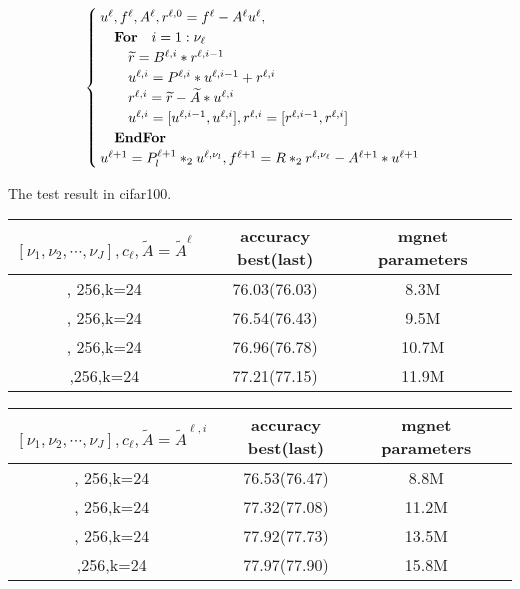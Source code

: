 \begin{equation}\label{eq:densenet}
\begin{cases}
u^{\ell},f^{\ell},A^{\ell},r^{\ell,0}=f^{\ell}-A^{\ell}u^{\ell}, \\

\quad\text{\bf For}\quad i = 1:\nu_{\ell} \\
\quad\quad \widetilde{r}=B^{\ell,i}\ast r^{\ell,i-1} \\
\quad\quad u^{\ell,i}=P^{\ell,i}\ast u^{\ell,i-1}+r^{\ell,i}\\
\quad\quad r^{\ell,i}=\widetilde{r}-\widetilde{A}\ast u^{\ell,i}\\
\quad\quad u^{\ell,i}=[u^{\ell,i-1},u^{\ell,i}],r^{\ell,i}=[r^{\ell,i-1},r^{\ell,i}]\\
\quad \text{\bf EndFor} \\
u^{\ell+1}=P^{\ell+1}_{l}\ast_2 u^{\ell,\nu_l},f^{\ell+1}=R \ast_2 r^{\ell,\nu_\ell}-A^{\ell+1}\ast u^{\ell+1}
\end{cases}
\end{equation}

The test result in cifar100.
\begin{table}[!htbp]
	\begin{center}
			\begin{tabular}{|c|c|c|c|}
                \hline
				$[\nu_1,\nu_2,\cdots,\nu_J], c_\ell,\widetilde{A}=\widetilde{A}^{\ell}$   &  accuracy best(last)  & mgnet parameters \tabularnewline
				\hline
				[4,4,4,4], 256,k=24                         &  76.03(76.03)         &     8.3M         \tabularnewline
				\hline
				[6,6,6,6], 256,k=24                         &  76.54(76.43)         &     9.5M        \tabularnewline
				\hline		
				[8,8,8,8], 256,k=24                         &  76.96(76.78)         &     10.7M        \tabularnewline
				\hline
                [10,10,10,10],256,k=24                      &  77.21(77.15)         &     11.9M        \tabularnewline
				\hline
			\end{tabular}
	\end{center}
\end{table}


\begin{table}[!htbp]
	\begin{center}
			\begin{tabular}{|c|c|c|c|}
                \hline
				$[\nu_1,\nu_2,\cdots,\nu_J], c_\ell,\widetilde{A}=\widetilde{A}^{\ell,i}$   &  accuracy best(last)  & mgnet parameters \tabularnewline
				\hline
				[4,4,4,4], 256,k=24                         &  76.53(76.47)         &     8.8M         \tabularnewline
				\hline
				[6,6,6,6], 256,k=24                         &  77.32(77.08)         &     11.2M        \tabularnewline
				\hline		
				[8,8,8,8], 256,k=24                         &  77.92(77.73)         &     13.5M        \tabularnewline
				\hline
                [10,10,10,10],256,k=24                      &  77.97(77.90)         &     15.8M        \tabularnewline
				\hline
			\end{tabular}
	\end{center}
\end{table}

